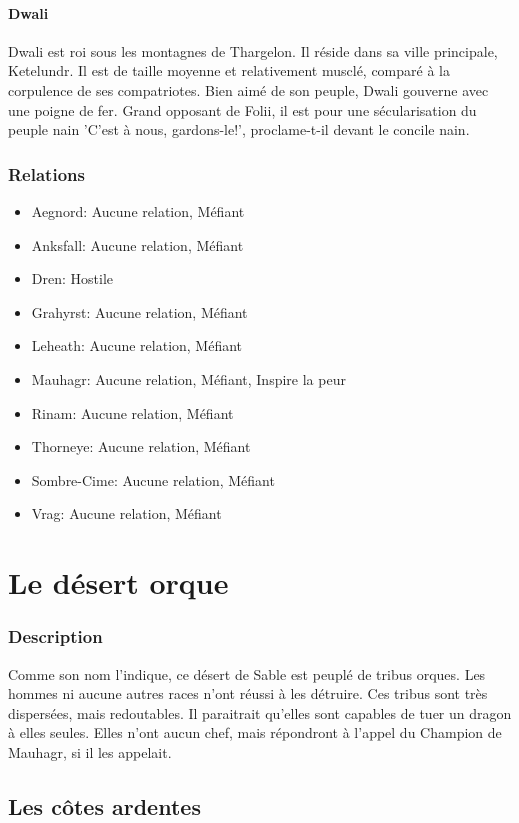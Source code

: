 \paragraph{Dwali}
\hypertarget{dwali}{}Dwali est roi sous les montagnes de Thargelon. Il réside dans sa ville principale, Ketelundr.
Il est de taille moyenne et relativement musclé, comparé à la corpulence de ses compatriotes.
Bien aimé de son peuple, Dwali gouverne avec une poigne de fer. 
Grand opposant de Folii, il est pour une sécularisation du peuple nain 'C'est à nous, gardons-le!', proclame-t-il devant le concile nain.
\subsubsection{Relations}
\begin{itemize}
\item Aegnord: Aucune relation, Méfiant  
\item Anksfall: Aucune relation, Méfiant 
\item Dren: Hostile    
\item Grahyrst: Aucune relation, Méfiant 
\item Leheath: Aucune relation, Méfiant 
\item Mauhagr: Aucune relation, Méfiant, Inspire la peur  
\item Rinam: Aucune relation, Méfiant 
\item Thorneye: Aucune relation, Méfiant 
\item Sombre-Cime: Aucune relation, Méfiant 
\item Vrag: Aucune relation, Méfiant  
\end{itemize}
\section{Le désert orque}
\subsubsection{Description}
\hypertarget{ledesertorque}{}Comme son nom l'indique, ce désert de Sable est peuplé de tribus orques. 
Les hommes ni aucune autres races n'ont réussi à les détruire.
Ces tribus sont très dispersées, mais redoutables.
Il paraitrait qu'elles sont capables de tuer un dragon à elles seules.
Elles n'ont aucun chef, mais répondront à l'appel du Champion de Mauhagr, si il les appelait. 
\subsection{Les côtes ardentes}
